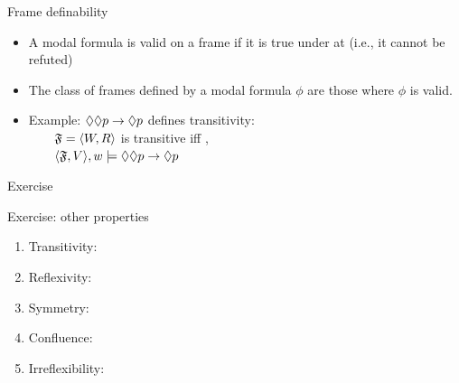 \documentclass{beamer}
\begin{document}
\begin{slide}{Frame definability}\label{s:32}
\small
\begin{itemize}
  \item A modal formula is valid on a frame if it is true under  at  (i.e., it cannot be refuted)
  \item The class of frames defined by a modal formula $\phi$ are those where $\phi$ is valid.
  \item Example: $\Diamond\Diamond p \to \Diamond p$ defines transitivity:\\
  ~~~~$\mathfrak{F}=\mathopen{\langle}W,R\mathclose{\rangle}$ is transitive iff ,\\
  ~~~~$\mathopen{\langle}\mathfrak{F},V\mathclose{\rangle},w\models \Diamond\Diamond p \to \Diamond p $
\end{itemize}
\end{slide}
\begin{slide}{Exercise}\label{s:32}
\small

\begin{exampleblock}{Exercise: other properties}
\begin{enumerate}
  \item Transitivity: 
  \item Reflexivity: 
  \item Symmetry:    
  \item Confluence:  
  \item Irreflexibility:  
\end{enumerate}
\end{exampleblock}

\end{slide}

\end{document}
